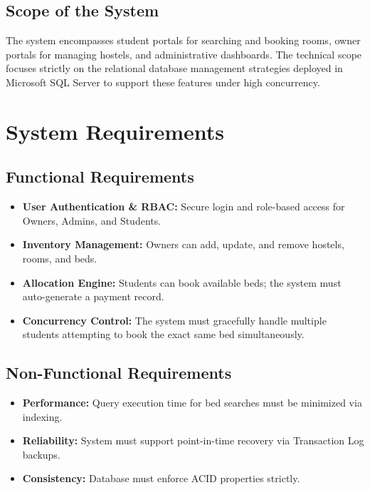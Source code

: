 \documentclass[12pt, a4paper]{report}
\begin{document}
\section{Scope of the System}
The system encompasses student portals for searching and booking rooms, owner portals for managing hostels, and administrative dashboards. The technical scope focuses strictly on the relational database management strategies deployed in Microsoft SQL Server to support these features under high concurrency.

\chapter{System Requirements}
\section{Functional Requirements}
\begin{itemize}
    \item \textbf{User Authentication \& RBAC:} Secure login and role-based access for Owners, Admins, and Students.
    \item \textbf{Inventory Management:} Owners can add, update, and remove hostels, rooms, and beds.
    \item \textbf{Allocation Engine:} Students can book available beds; the system must auto-generate a payment record.
    \item \textbf{Concurrency Control:} The system must gracefully handle multiple students attempting to book the exact same bed simultaneously.
\end{itemize}

\section{Non-Functional Requirements}
\begin{itemize}
    \item \textbf{Performance:} Query execution time for bed searches must be minimized via indexing.
    \item \textbf{Reliability:} System must support point-in-time recovery via Transaction Log backups.
    \item \textbf{Consistency:} Database must enforce ACID properties strictly.
\end{itemize}
\end{document}
